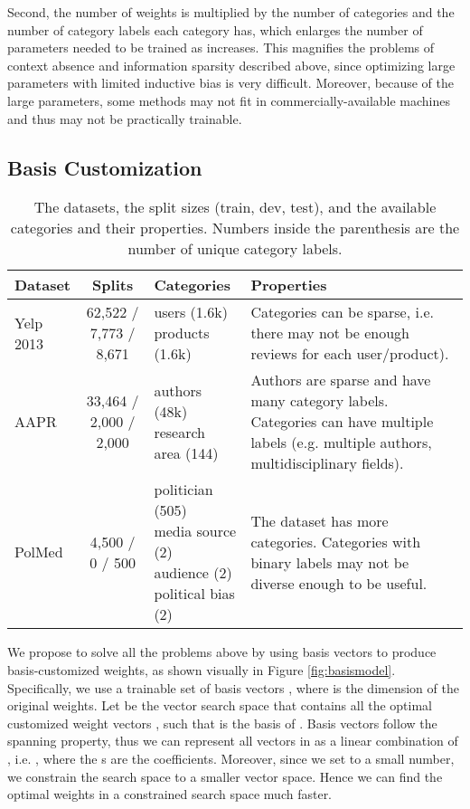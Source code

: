 \documentclass[11pt,a4paper]{article}
\begin{document}
Second, the number of weights is multiplied by the number of categories  and the number of category labels each category has, which enlarges the number of parameters needed to be trained as  increases. This magnifies the problems of context absence and information sparsity described above, since optimizing large parameters with limited inductive bias is very difficult. Moreover, because of the large parameters, some methods may not fit in commercially-available machines and thus may not be practically trainable.

\subsection{Basis Customization}

\begin{table*}[t]
  \centering
    \begin{tabularx}{\textwidth}{|l|c|l|X|}
    \hline
    Dataset & Splits & Categories & Properties \\
    \hline
    Yelp 2013 & 62,522 / 7,773 / 8,671 & \makecell[tl]{ users (1.6k)\\ products (1.6k)} & Categories can be sparse, i.e. there may not be enough reviews for each user/product).\\
    \hline
    AAPR  & 33,464 / 2,000 / 2,000 & \makecell[tl]{ authors (48k)\\ research area (144)} & Authors are sparse and have many category labels. Categories can have multiple labels (e.g. multiple authors, multidisciplinary fields). \\
    \hline
    PolMed & 4,500 / 0 / 500 & \makecell[tl]{ politician (505)\\ media source (2)\\ audience (2)\\ political bias (2)} & The dataset has more categories. Categories with binary labels may not be diverse enough to be useful. \\
    \hline
    \end{tabularx}\caption{The datasets, the split sizes (train, dev, test), and the available categories and their properties. Numbers inside the parenthesis are the number of unique category labels.}
  \label{tab:dataset}\end{table*}

We propose to solve all the problems above by using basis vectors to produce basis-customized weights, as shown visually in Figure \ref{fig:basismodel}. Specifically, we use a trainable set of  basis vectors , where  is the dimension of the original weights. Let  be the vector search space that contains all the optimal customized weight vectors , such that  is the basis of . Basis vectors follow the spanning property, thus we can represent all vectors in  as a linear combination of , i.e. , where the s are the coefficients. Moreover, since we set  to a small number, we constrain the search space to a smaller vector space. Hence we can find the optimal weights in a constrained search space much faster.
\end{document}
